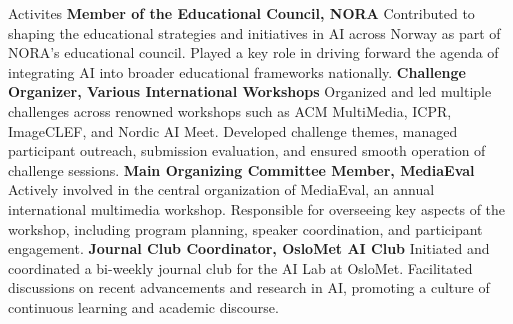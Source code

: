 \begin{rubric}{Activites}
\entry*[2023 -- present]%
\textbf{Member of the Educational Council, NORA} Contributed to shaping the educational strategies and initiatives in AI across Norway as part of NORA's educational council. Played a key role in driving forward the agenda of integrating AI into broader educational frameworks nationally.
% 
\entry*[2018 -- present]%
\textbf{Challenge Organizer, Various International Workshops} Organized and led multiple challenges across renowned workshops such as ACM MultiMedia, ICPR, ImageCLEF, and Nordic AI Meet. Developed challenge themes, managed participant outreach, submission evaluation, and ensured smooth operation of challenge sessions.
%
\entry*[2018 -- present]%
\textbf{Main Organizing Committee Member, MediaEval} Actively involved in the central organization of MediaEval, an annual international multimedia workshop. Responsible for overseeing key aspects of the workshop, including program planning, speaker coordination, and participant engagement.
% 
\entry*[2019 -- 2020]%
\textbf{Journal Club Coordinator, OsloMet AI Club} Initiated and coordinated a bi-weekly journal club for the AI Lab at OsloMet. Facilitated discussions on recent advancements and research in AI, promoting a culture of continuous learning and academic discourse.
\end{rubric}